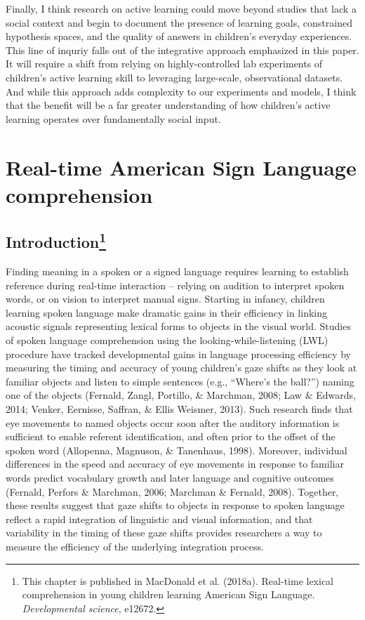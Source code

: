 \documentclass[oneside]{report}
\begin{document}
Finally, I think research on active learning could move beyond studies
that lack a social context and begin to document the presence of
learning goals, constrained hypothesis spaces, and the quality of
answers in children's everyday experiences. This line of inquriy falls
out of the integrative approach emphasized in this paper. It will
require a shift from relying on highly-controlled lab experiments of
children's active learning skill to leveraging large-scale,
observational datasets. And while this approach adds complexity to our
experiments and models, I think that the benefit will be a far greater
understanding of how children's active learning operates over
fundamentally social input.

\hypertarget{sol}{%
\chapter{Real-time American Sign Language comprehension}\label{sol}}

\hypertarget{introduction-1}{%
\section[Introduction]{\texorpdfstring{Introduction\footnote{This
  chapter is published in MacDonald et al. (2018a). Real-time lexical
  comprehension in young children learning American Sign Language.
  \emph{Developmental science}, e12672.}}{Introduction}}\label{introduction-1}}

Finding meaning in a spoken or a signed language requires learning to
establish reference during real-time interaction -- relying on audition
to interpret spoken words, or on vision to interpret manual signs.
Starting in infancy, children learning spoken language make dramatic
gains in their efficiency in linking acoustic signals representing
lexical forms to objects in the visual world. Studies of spoken language
comprehension using the looking-while-listening (LWL) procedure have
tracked developmental gains in language processing efficiency by
measuring the timing and accuracy of young children's gaze shifts as
they look at familiar objects and listen to simple sentences (e.g.,
``Where's the ball?'') naming one of the objects (Fernald, Zangl,
Portillo, \& Marchman, 2008; Law \& Edwards, 2014; Venker, Eernisse,
Saffran, \& Ellis Weismer, 2013). Such research finds that eye movements
to named objects occur soon after the auditory information is sufficient
to enable referent identification, and often prior to the offset of the
spoken word (Allopenna, Magnuson, \& Tanenhaus, 1998). Moreover,
individual differences in the speed and accuracy of eye movements in
response to familiar words predict vocabulary growth and later language
and cognitive outcomes (Fernald, Perfors \& Marchman, 2006; Marchman \&
Fernald, 2008). Together, these results suggest that gaze shifts to
objects in response to spoken language reflect a rapid integration of
linguistic and visual information, and that variability in the timing of
these gaze shifts provides researchers a way to measure the efficiency
of the underlying integration process.
\end{document}

